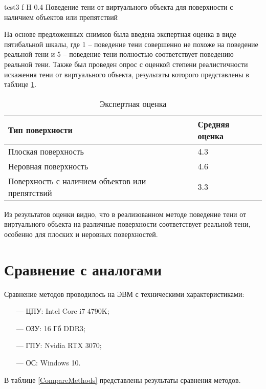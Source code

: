 {test3}
{f}
{H}
{0.4\textwidth}
{Поведение тени от виртуального объекта для поверхности с наличием объектов или препятствий}

На основе предложенных снимков была введена экспертная оценка в виде пятибальной шкалы, где 1 -- поведение тени совершенно не похоже на поведение реальной тени и 5 -- поведение тени полностью соответствует поведению реальной тени. Также был проведен опрос с оценкой степени реалистичности искажения тени от виртуального объекта, результаты которого представлены в таблице \ref{Otsenka}.

\begin{table}[H]
	\caption{Экспертная оценка}
	\label{Otsenka}
	\begin{center}
		\begin{tabular}{| p{8 cm} | p{3.5 cm} |} 
			\hline
			Тип поверхности & Средняя оценка \\
			\hline
			Плоская поверхность & 4.3 \\
			\hline
			Неровная поверхность & 4.6 \\
			\hline
			Поверхность с наличием объектов или препятствий & 3.3 \\
			\hline
		\end{tabular}
	\end{center}
\end{table}

Из результатов оценки видно, что в реализованном методе поведение тени от виртуального объекта на различные поверхности соответствует реальной тени, особенно для плоских и неровных поверхностей.

\section{Сравнение с аналогами}

Сравнение методов проводилось на ЭВМ с техническими характеристиками:

\begin{itemize}
	\item[---] ЦПУ: Intel Core i7 4790K;
	\item[---] ОЗУ: 16 Гб DDR3;
	\item[---] ГПУ: Nvidia RTX 3070;
	\item[---] ОС: Windows 10.
\end{itemize}

В таблице \ref{CompareMethods} представлены результаты сравнения методов.

